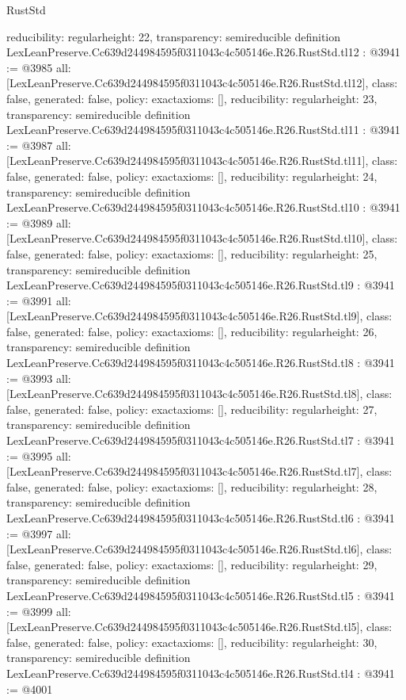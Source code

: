 \begin{lexlean}{RustStd}
\begin{coremodule}
{  reducibility: regular{height: 22},
  transparency: semireducible
}
definition LexLeanPreserve.Cc639d244984595f0311043c4c505146e.R26.RustStd.tl12 : @3941 := @3985 {
  all: [LexLeanPreserve.Cc639d244984595f0311043c4c505146e.R26.RustStd.tl12],
  class: false,
  generated: false,
  policy: exact{axioms: []},
  reducibility: regular{height: 23},
  transparency: semireducible
}
definition LexLeanPreserve.Cc639d244984595f0311043c4c505146e.R26.RustStd.tl11 : @3941 := @3987 {
  all: [LexLeanPreserve.Cc639d244984595f0311043c4c505146e.R26.RustStd.tl11],
  class: false,
  generated: false,
  policy: exact{axioms: []},
  reducibility: regular{height: 24},
  transparency: semireducible
}
definition LexLeanPreserve.Cc639d244984595f0311043c4c505146e.R26.RustStd.tl10 : @3941 := @3989 {
  all: [LexLeanPreserve.Cc639d244984595f0311043c4c505146e.R26.RustStd.tl10],
  class: false,
  generated: false,
  policy: exact{axioms: []},
  reducibility: regular{height: 25},
  transparency: semireducible
}
definition LexLeanPreserve.Cc639d244984595f0311043c4c505146e.R26.RustStd.tl9 : @3941 := @3991 {
  all: [LexLeanPreserve.Cc639d244984595f0311043c4c505146e.R26.RustStd.tl9],
  class: false,
  generated: false,
  policy: exact{axioms: []},
  reducibility: regular{height: 26},
  transparency: semireducible
}
definition LexLeanPreserve.Cc639d244984595f0311043c4c505146e.R26.RustStd.tl8 : @3941 := @3993 {
  all: [LexLeanPreserve.Cc639d244984595f0311043c4c505146e.R26.RustStd.tl8],
  class: false,
  generated: false,
  policy: exact{axioms: []},
  reducibility: regular{height: 27},
  transparency: semireducible
}
definition LexLeanPreserve.Cc639d244984595f0311043c4c505146e.R26.RustStd.tl7 : @3941 := @3995 {
  all: [LexLeanPreserve.Cc639d244984595f0311043c4c505146e.R26.RustStd.tl7],
  class: false,
  generated: false,
  policy: exact{axioms: []},
  reducibility: regular{height: 28},
  transparency: semireducible
}
definition LexLeanPreserve.Cc639d244984595f0311043c4c505146e.R26.RustStd.tl6 : @3941 := @3997 {
  all: [LexLeanPreserve.Cc639d244984595f0311043c4c505146e.R26.RustStd.tl6],
  class: false,
  generated: false,
  policy: exact{axioms: []},
  reducibility: regular{height: 29},
  transparency: semireducible
}
definition LexLeanPreserve.Cc639d244984595f0311043c4c505146e.R26.RustStd.tl5 : @3941 := @3999 {
  all: [LexLeanPreserve.Cc639d244984595f0311043c4c505146e.R26.RustStd.tl5],
  class: false,
  generated: false,
  policy: exact{axioms: []},
  reducibility: regular{height: 30},
  transparency: semireducible
}
definition LexLeanPreserve.Cc639d244984595f0311043c4c505146e.R26.RustStd.tl4 : @3941 := @4001 {
}
\end{coremodule}
\end{lexlean}
